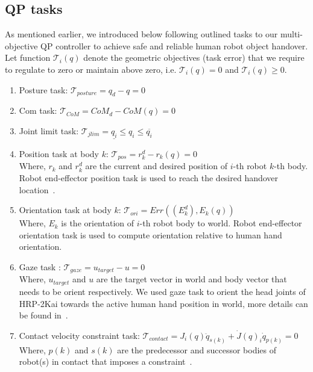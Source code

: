 \documentclass[a4paper, 12pt, oneside]{Thesis}  %
\begin{document}
\subsection{QP tasks}\label{tasks}
As mentioned earlier, we introduced below following outlined tasks to our multi-objective QP controller to achieve safe and reliable human robot object handover. Let function $\mathscr{T}_i(q)$ denote the geometric objectives (task error) that we require to regulate to zero or maintain above zero, i.e. $\mathscr{T}_i(q) = 0$ and $\mathscr{T}_i(q) \geq 0$.  

\begin{enumerate}[start=1,label={\bf\arabic*.}]

\item Posture task: $\mathscr{T}_{posture} = q_d - q = 0$  

\item Com task: $\mathscr{T}_{CoM} = CoM_d - CoM(q) = 0$

\item Joint limit task: $\mathscr{T}_{jlim} = \underline{q_i} \leq q_i \leq \overline{q_i}$  

\item Position task at body $k$: $\mathscr{T}_{pos} = r^d_k - r_k(q) = 0$\\
Where, $r_k$ and $r^d_k$ are the current and desired position of $i$-th robot $k$-th body. Robot end-effector position task is used to reach the desired handover location~\cite{ladder-HRP-2Kai}.

\item Orientation task at body $k$: $\mathscr{T}_{ori} = Err((E^d_k),  E_k(q))$\\
Where, $E_k$ is the orientation of $i$-th robot body to world. Robot end-effector orientation task is used to compute orientation relative to human hand orientation.

\item Gaze task : $\mathscr{T}_{gaze} =u_{target} - u = 0$\\
Where, $u_{target}$  and $u$ are the target vector in world and body vector that needs to be orient respectively. We used gaze task to orient the head joints of HRP-2Kai towards the active human hand position in world, more details can be found in~\cite{samy2017VecOriTask}.

\item Contact velocity constraint task: $\mathscr{T}_{contact} = J_i(q)\ddot{q}_{s(k)} + \dot{J}(q)_i\dot{q}_{p(k)} = 0$\\
Where, $p(k)$ and $s(k)$ are the predecessor and successor bodies of robot(s) in contact that imposes a constraint~\cite{featherstone2014rigid}.\\

\end{enumerate}
\end{document}
